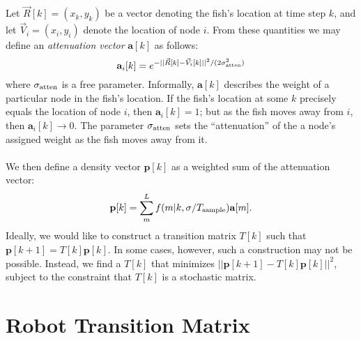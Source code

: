 \documentclass[11pt,letterpaper]{article}
\begin{document}
	Let $\vec{R}[k] = (x_k, y_k)$ be a vector denoting the fish's location at time step $k$, and let $\vec{V}_i = (x_i, y_i)$ denote the location of node $i$. From these quantities we may define an \textit{attenuation vector} $\mathbf{a}[k]$ as follows:
	\[
	\mathbf a_i[k] = e^{-||\vec{R}[k] - \vec{V}_i[k]||^2 / (2 \sigma_{\rm atten}^2)}
	\]
	where $\sigma_{\rm atten}$ is a free parameter. Informally, $\mathbf a[k]$ describes the weight of a particular node in the fish's location. If the fish's location at some $k$ precisely equals the location of node $i$, then $\mathbf a_i[k] = 1$; but as the fish moves away from $i$, then $\mathbf a_i[k] \rightarrow 0$. The parameter $\sigma_{\rm atten}$ sets the ``attenuation'' of the a node's assigned weight as the fish moves away from it.
	\\\\
	We then define a density vector $\mathbf {p}[k]$ as a weighted sum of the attenuation vector:
	\[
	\mathbf p[k] = \sum^L_m f(m|k, \sigma / T_{\rm sample}) \mathbf a[m].
	\]
	Ideally, we would like to construct a transition matrix $T[k]$ such that $\mathbf{p}[k + 1] = T[k]\mathbf{p}[k]$. In some cases, however, such a construction may not be possible. Instead, we find a $T[k]$ that minimizes $||\mathbf p[k + 1] - T[k]\mathbf p[k] ||^2$, subject to the constraint that $T[k]$ is a stochastic matrix.
	
	\section{Robot Transition Matrix}
	
	
	
\end{document}
